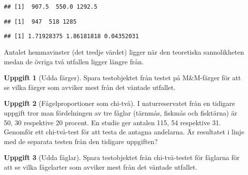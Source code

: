 \documentclass[
]{book}
\newenvironment{Shaded}{\begin{snugshade}}{\end{snugshade}}
\newcommand{\DecValTok}[1]{\textcolor[rgb]{0.00,0.00,0.81}{#1}}
\newcommand{\NormalTok}[1]{#1}
\newcommand{\SpecialCharTok}[1]{\textcolor[rgb]{0.81,0.36,0.00}{\textbf{#1}}}
\theoremstyle{definition}
\theoremstyle{definition}
\theoremstyle{definition}
\newtheorem{exercise}{Uppgift}[chapter]
\theoremstyle{definition}
\theoremstyle{remark}
\begin{document}
\begin{verbatim}
## [1]  907.5  550.0 1292.5
\end{verbatim}

\begin{Shaded}
\end{Shaded}

\begin{verbatim}
## [1]  947  518 1285
\end{verbatim}

\begin{Shaded}
\end{Shaded}

\begin{verbatim}
## [1] 1.71928375 1.86181818 0.04352031
\end{verbatim}

Antalet hemmavinster (det tredje värdet) ligger när den teoretiska sannolikheten medan de övriga två utfallen ligger längre från.

\begin{exercise}[Udda färger]
Spara testobjektet från testet på M\&M-färger för att se vilka färger som avviker mest från det väntade utfallet.
\end{exercise}

\begin{exercise}[Fågelproportioner som chi-två]
I naturreservatet från en tidigare uppgift tror man fördelningen av tre fåglar (tärnmås, fiskmås och fisktärna) är 50, 30 respektive 20 procent. En studie ger antalen 115, 54 respektive 31. Genomför ett chi-två-test för att testa de antagna andelarna. Är resultatet i linje med de separata testen från den tidigare uppgiften?
\end{exercise}

\begin{exercise}[Udda fåglar]
Spara testobjektet från chi-två-testet för fåglarna för att se vilka fågelarter som avviker mest från det väntade utfallet.
\end{exercise}
\end{document}
